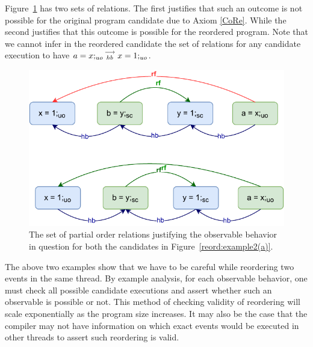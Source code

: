         Figure~\ref{reord:example2(b)} has two sets of relations. 
        The first justifies that such an outcome is not possible for the original program candidate due to Axiom \ref{CoRe}. 
        While the second justifies that this outcome is possible for the reordered program.
        Note that we cannot infer in the reordered candidate the set of relations for any candidate execution to have $a=x;_{uo}\stackrel{\longrightarrow}{_{hb}}x=1;_{uo}$. 
        \begin{figure}[H]
            \centering
            \includegraphics[scale=0.7]{4.InstructionReordering/0.Intro/ReorderingExample2(b).pdf}
            \caption{The set of partial order relations justifying the observable behavior in question for both the candidates in Figure~\ref{reord:example2(a)}.} 
            \label{reord:example2(b)}
        \end{figure}

        The above two examples show that we have to be careful while reordering two events in the same thread. 
        By example analysis, for each observable behavior, one must check all possible candidate executions and assert whether such an observable is possible or not. 
        This method of checking validity of reordering will scale exponentially as the program size increases. 
        It may also be the case that the compiler may not have information on which exact events would be executed in other threads to assert such reordering is valid. 

    
    
    
    
    